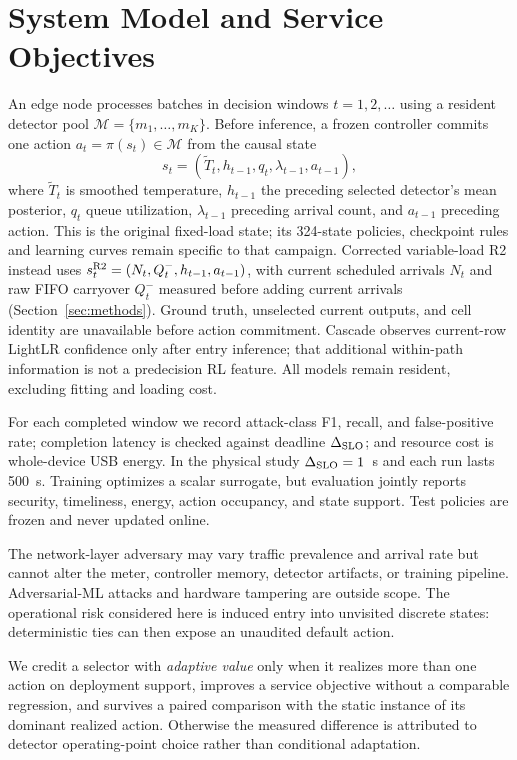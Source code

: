 \section{System Model and Service Objectives}
\label{sec:system}
An edge node processes batches in decision windows $t=1,2,\ldots$ using a resident detector pool $\mathcal M=\{m_1,\ldots,m_K\}$. Before inference, a frozen controller commits one action $a_t=\pi(s_t)\in\mathcal M$ from the causal state
\begin{equation}\label{eq:state}
s_t=(\widetilde T_t,h_{t-1},q_t,\lambda_{t-1},a_{t-1}),
\end{equation}
where $\widetilde T_t$ is smoothed temperature, $h_{t-1}$ the preceding selected detector's mean posterior, $q_t$ queue utilization, $\lambda_{t-1}$ preceding arrival count, and $a_{t-1}$ preceding action. This is the original fixed-load state; its 324-state policies, checkpoint rules and learning curves remain specific to that campaign. Corrected variable-load R2 instead uses $s_t^{\rm R2}=(N_t,Q_t^-,h_{t-1},a_{t-1})$, with current scheduled arrivals $N_t$ and raw FIFO carryover $Q_t^-$ measured before adding current arrivals (Section~\ref{sec:methods}). Ground truth, unselected current outputs, and cell identity are unavailable before action commitment. Cascade observes current-row LightLR confidence only after entry inference; that additional within-path information is not a predecision RL feature. All models remain resident, excluding fitting and loading cost.

For each completed window we record attack-class F1, recall, and false-positive rate; completion latency is checked against deadline $\Delta_{\rm SLO}$; and resource cost is whole-device USB energy. In the physical study $\Delta_{\rm SLO}=1$~s and each run lasts 500~s. Training optimizes a scalar surrogate, but evaluation jointly reports security, timeliness, energy, action occupancy, and state support. Test policies are frozen and never updated online.

The network-layer adversary may vary traffic prevalence and arrival rate but cannot alter the meter, controller memory, detector artifacts, or training pipeline. Adversarial-ML attacks and hardware tampering are outside scope. The operational risk considered here is induced entry into unvisited discrete states: deterministic ties can then expose an unaudited default action.

We credit a selector with \emph{adaptive value} only when it realizes more than one action on deployment support, improves a service objective without a comparable regression, and survives a paired comparison with the static instance of its dominant realized action. Otherwise the measured difference is attributed to detector operating-point choice rather than conditional adaptation.
